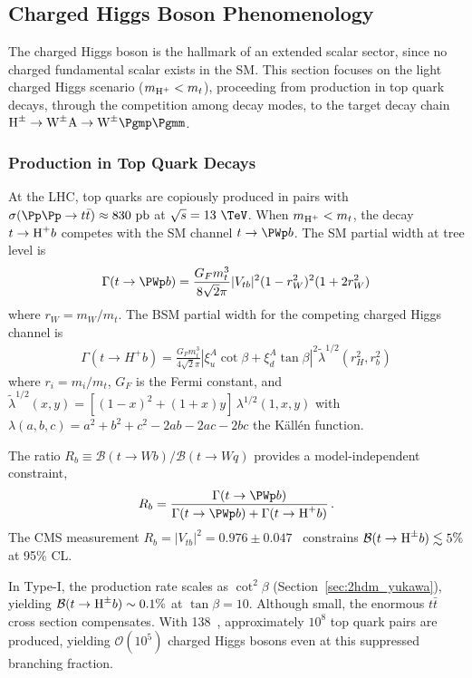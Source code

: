 \subsection{Charged Higgs Boson Phenomenology}
\label{sec:theory_charged}

The charged Higgs boson is the hallmark of an extended scalar sector, since no charged fundamental scalar exists in the SM. This section focuses on the light charged Higgs scenario ($m_{\text{H}^+} < m_t$), proceeding from production in top quark decays, through the competition among decay modes, to the target decay chain $\PHc \to \PWpm \PA \to \PWpm \Pgmp\Pgmm$.

\subsubsection{Production in Top Quark Decays}

At the LHC, top quarks are copiously produced in pairs with $\sigma(\Pp\Pp \to t\bar{t}) \approx 830~\text{pb}$ at $\sqrt{s} = 13~\TeV$. When $m_{\text{H}^+} < m_t$, the decay $t \to \text{H}^+ b$ competes with the SM channel $t \to \PWp b$. The SM partial width at tree level is~\cite{Jezabek:1988iv}
\begin{gather}
\Gamma(t \to \PWp b) = \frac{G_F m_t^3}{8\sqrt{2}\pi} |V_{tb}|^2 (1 - r_W^2)^2 (1 + 2r_W^2) \label{eq:Gamma_t_Wb}
\end{gather}
where $r_W = m_W/m_t$. The BSM partial width for the competing charged Higgs channel is~\cite{Branco:2011iw,Gunion:1990dt}
\begin{gather}
\Gamma(t \to H^+ b) = \frac{G_F m_t^3}{4\sqrt{2}\pi} |\xi_u^A \cot\beta + \xi_d^A \tan\beta|^2 \tilde{\lambda}^{1/2}(r_H^2, r_b^2) \label{eq:Gamma_t_Hb}
\end{gather}
where $r_i = m_i/m_t$, $G_F$ is the Fermi constant, and $\tilde{\lambda}^{1/2}(x, y) = [(1-x)^2 + (1+x)y]\,\lambda^{1/2}(1,x,y)$ with $\lambda(a,b,c) = a^2 + b^2 + c^2 - 2ab - 2ac - 2bc$ the Källén function.

The ratio $R_b \equiv \mathcal{B}(t \to Wb)/\mathcal{B}(t \to Wq)$ provides a model-independent constraint,
\begin{gather}
R_b = \frac{\Gamma(t \to \PWp b)}{\Gamma(t \to \PWp b) + \Gamma(t \to \PHp b)} \,.
\label{eq:Rb_definition}
\end{gather}
The CMS measurement $R_b = |V_{tb}|^2 = 0.976 \pm 0.047$~\cite{CMS:2020vac} constrains $\mathcal{B}(t \to \text{H}^{\pm} b) \lesssim 5\%$ at 95\% CL.

In Type-I, the production rate scales as $\cot^2\beta$ (Section~\ref{sec:2hdm_yukawa}), yielding $\mathcal{B}(t \to \text{H}^{\pm} b) \sim 0.1\%$ at $\tan\beta = 10$. Although small, the enormous $t\bar{t}$ cross section compensates. With 138~\fbinv, approximately $10^8$ top quark pairs are produced, yielding $\mathcal{O}(10^5)$ charged Higgs bosons even at this suppressed branching fraction.

